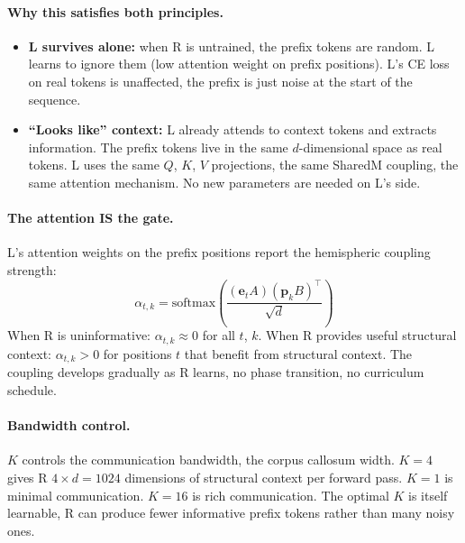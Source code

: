\documentclass[11pt, a4paper]{article}
\theoremstyle{plain}
\theoremstyle{definition}
\theoremstyle{remark}
\begin{document}
\paragraph{Why this satisfies both principles.}
\begin{itemize}[nosep]
\item \textbf{L survives alone:} when R is untrained, the prefix tokens are random.
L learns to ignore them (low attention weight on prefix positions).
L's CE loss on real tokens is unaffected, the prefix is just noise at the start of the sequence.
\item \textbf{``Looks like'' context:} L already attends to context tokens and extracts information.
The prefix tokens live in the same $d$-dimensional space as real tokens.
L uses the same $Q$, $K$, $V$ projections, the same SharedM coupling, the same attention mechanism.
No new parameters are needed on L's side.
\end{itemize}

\paragraph{The attention IS the gate.}
L's attention weights on the prefix positions report the hemispheric coupling strength:
\begin{equation}
\alpha_{t,k} = \mathrm{softmax}\!\left(\frac{(\mathbf{e}_t A)(\mathbf{p}_k B)^\top}{\sqrt{d}}\right)
\end{equation}
When R is uninformative: $\alpha_{t,k} \approx 0$ for all $t$, $k$.
When R provides useful structural context: $\alpha_{t,k} > 0$ for positions $t$ that benefit from structural context.
The coupling develops gradually as R learns, no phase transition, no curriculum schedule.

\paragraph{Bandwidth control.}
$K$ controls the communication bandwidth, the corpus callosum width.
$K = 4$ gives R $4 \times d = 1024$ dimensions of structural context per forward pass.
$K = 1$ is minimal communication.
$K = 16$ is rich communication.
The optimal $K$ is itself learnable, R can produce fewer informative prefix tokens rather than many noisy ones.
\end{document}
